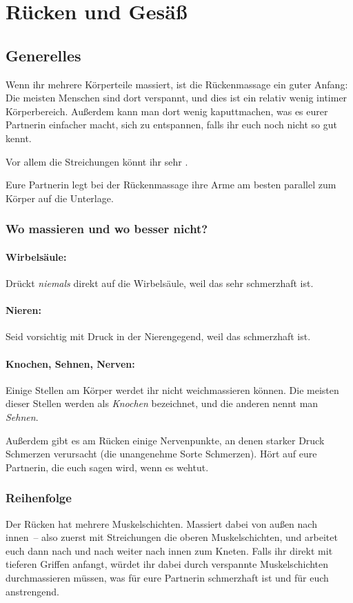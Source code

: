 \section{Rücken und Gesäß}

\subsection{Generelles}

Wenn ihr mehrere Körperteile massiert, ist die Rückenmassage ein guter Anfang: Die meisten Menschen sind dort verspannt, und dies ist ein relativ wenig intimer Körperbereich. Außerdem kann man dort wenig kaputtmachen, was es eurer Partnerin einfacher macht, sich zu entspannen, falls ihr euch noch nicht so gut kennt.

Vor allem die Streichungen könnt ihr sehr .

Eure Partnerin legt bei der Rückenmassage ihre Arme am besten parallel zum Körper auf die Unterlage.


\subsubsection{Wo massieren und wo besser nicht?}

\paragraph{Wirbelsäule:} Drückt \emph{niemals} direkt auf die Wirbelsäule, weil das sehr schmerzhaft ist.

\paragraph{Nieren:} Seid vorsichtig mit Druck in der Nierengegend, weil das schmerzhaft ist.

\paragraph{Knochen, Sehnen, Nerven:} Einige Stellen am Körper werdet ihr nicht weichmassieren können. Die meisten dieser Stellen werden als \emph{Knochen} bezeichnet, und die anderen nennt man \emph{Sehnen}.

Außerdem gibt es am Rücken einige Nervenpunkte, an denen starker Druck Schmerzen verursacht (die unangenehme Sorte Schmerzen). Hört auf eure Partnerin, die euch sagen wird, wenn es wehtut.


\subsubsection{Reihenfolge}
Der Rücken hat mehrere Muskelschichten. Massiert dabei von außen nach innen~-- also zuerst mit Streichungen die oberen Muskelschichten, und arbeitet euch dann nach und nach weiter nach innen zum Kneten. Falls ihr direkt mit tieferen Griffen anfangt, würdet ihr dabei durch verspannte Muskelschichten durchmassieren müssen, was für eure Partnerin schmerzhaft ist und für euch anstrengend.

